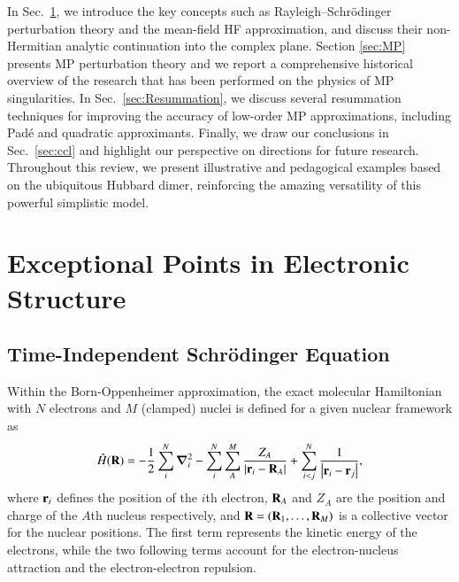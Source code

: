 \documentclass[aps,prb,reprint,noshowkeys,superscriptaddress]{revtex4-1}
\newcommand{\Ne}{N} %
\newcommand{\Nn}{M} %
\newcommand{\hH}{\Hat{H}}
\begin{document}
In Sec.~\ref{sec:EPs}, we introduce the key concepts such as Rayleigh--Schr\"odinger perturbation theory and the mean-field HF approximation, and discuss their non-Hermitian analytic continuation into the complex plane.
Section \ref{sec:MP} presents MP perturbation theory and we report a comprehensive historical overview of the research that
has been performed on the physics of MP singularities.
In Sec.~\ref{sec:Resummation}, we discuss several resummation techniques for improving the accuracy
of low-order MP approximations, including Pad\'e and quadratic approximants.
Finally, we draw our conclusions in Sec.~\ref{sec:ccl} and highlight our perspective on directions for 
future research.
Throughout this review, we present illustrative and pedagogical examples based on the ubiquitous 
Hubbard dimer, reinforcing the amazing versatility of this powerful simplistic model.

\section{Exceptional Points in Electronic Structure}
\label{sec:EPs}

\subsection{Time-Independent Schr\"odinger Equation}
\label{sec:TDSE}
Within the Born-Oppenheimer approximation, the exact molecular Hamiltonian with $\Ne$ electrons and 
$\Nn$ (clamped) nuclei is defined for a given nuclear framework as
\begin{equation}\label{eq:ExactHamiltonian}
    \hH(\vb{R}) = 
    - \frac{1}{2} \sum_{i}^{\Ne} \grad_i^2 
    - \sum_{i}^{\Ne} \sum_{A}^{\Nn} \frac{Z_A}{\abs{\vb{r}_i-\vb{R}_A}} 
    + \sum_{i<j}^{\Ne}\frac{1}{\abs{\vb{r}_i-\vb{r}_j}},
\end{equation}
where $\vb{r}_i$ defines the position of the $i$th electron, $\vb{R}_{A}$ and $Z_{A}$ are the position
and charge of the $A$th nucleus respectively, and $\vb{R} = (\vb{R}_{1}, \dots, \vb{R}_{\Nn})$ is a
collective vector for the nuclear positions.
The first term represents the kinetic energy of the electrons, while 
the two following terms account for the electron-nucleus attraction and the electron-electron repulsion.
\end{document}
